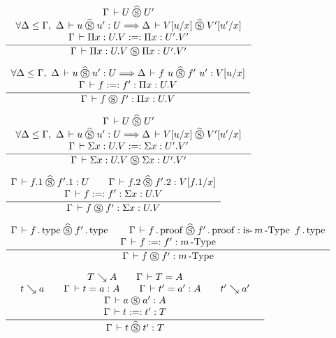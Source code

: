 \documentclass[a4paper,english]{lipics-utf8x}
\begin{document}
  \begin{center}
  \(
    \tru{\Gamma \der U \hSr U'
       }{\forall \Delta \le \Gamma,\ \Delta \der u \hSr u' : U \gives
         \Delta \der V[u/x] \hSr V'[u'/x]
       }{\Gamma \der \Pi x:U.V :=: \Pi x:U'.V'
       }{\Gamma \der \Pi x:U.V \Sr \Pi x:U'.V'}
  \)
  \end{center}

  \begin{center}
  \(
    \dru{\forall \Delta \le \Gamma,\ \Delta \der u \hSr u' : U \gives
         \Delta \der f~u \hSr f'~u' : V[u/x]
       }{\Gamma \der f :=: f' : \Pi x:U.V
       }{\Gamma \der f \Sr f' : \Pi x:U.V}
  \)
  \end{center}

  \begin{center}
  \(
    \tru{\Gamma \der U \hSr U'
       }{\forall \Delta \le \Gamma,\ \Delta \der u \hSr u' : U \gives
         \Delta \der V[u/x] \hSr V'[u'/x]
       }{\Gamma \der \Sigma x:U.V :=: \Sigma x:U'.V'
       }{\Gamma \der \Sigma x:U.V \Sr \Sigma x:U'.V'}
  \)
  \end{center}

  \begin{center}
  \(
    \dru{\Gamma \der f.1 \hSr f'.1 : U \qquad
         \Gamma \der f.2 \hSr f'.2 : V[f.1/x]
       }{\Gamma \der f :=: f' : \Sigma x:U.V
       }{\Gamma \der f \Sr f' : \Sigma x:U.V}
  \)
  \end{center}

  \begin{center}
  \(
    \dru{\Gamma \der f \gettype \hSr f' \gettype \qquad
         \Gamma \der f \getproof \hSr f' \getproof : \isnType{m}{f \gettype}
       }{\Gamma \der f :=: f' : \nType{m}
       }{\Gamma \der f \Sr f' : \nType{m}}
  \)
  \end{center}

  \begin{center}
  \(
    \qru{T \rew A \qquad
         \Gamma \der T = A
       }{t \rew a \qquad
         \Gamma \der t = a : A \qquad
         \Gamma \der t' = a' : A \qquad
         t' \rew a'
       }{\Gamma \der a \Sr a' : A
       }{\Gamma \der t :=: t' : T
       }{\Gamma \der t \hSr t' : T}
  \)
  \end{center}
\end{document}
